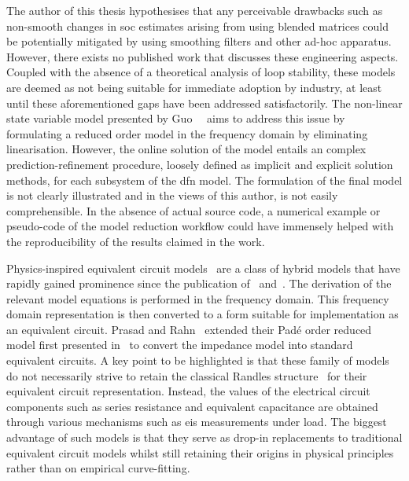 The author  of this thesis hypothesises  that any perceivable drawbacks  such as
non-smooth changes  in \gls{soc} estimates  arising from using  blended matrices
could  be potentially  mitigated by  using  smoothing filters  and other  ad-hoc
apparatus.  However,  there  exists  no  published  work  that  discusses  these
engineering aspects. Coupled with the absence  of a theoretical analysis of loop
stability,  these  models  are  deemed  as  not  being  suitable  for  immediate
adoption  by  industry, at  least  until  these  aforementioned gaps  have  been
addressed  satisfactorily.  The non-linear  state  variable  model presented  by
Guo~\etal{}~\cite{Guo2017} aims to  address this issue by  formulating a reduced
order model in  the frequency domain by eliminating  linearisation. However, the
online solution of the model entails an complex prediction-refinement procedure,
loosely defined as implicit and explicit solution methods, for each subsystem of
the  \gls{dfn}  model.  The  formulation  of the  final  model  is  not  clearly
illustrated and  in the views of  this author, is not  easily comprehensible. In
the absence  of actual source  code, a numerical  example or pseudo-code  of the
model reduction workflow could have immensely helped with the reproducibility of
the results claimed in the work.


Physics-inspired                        equivalent                       circuit
models~\cite{Prasad2014,Zhang2017,Cheng2017,Merla2018}  are  a class  of  hybrid
models   that   have   rapidly   gained   prominence   since   the   publication
of~\cite{Jokar2016}  and~\cite{Fan2015}. The  derivation of  the relevant  model
equations  is  performed   in  the  frequency  domain.   This  frequency  domain
representation is  then converted to  a form  suitable for implementation  as an
equivalent circuit. Prasad and Rahn~\cite{Prasad2014} extended their Padé order
reduced  model first  presented  in~\cite{Prasad2013} to  convert the  impedance
model into standard  equivalent circuits. A key point to  be highlighted is that
these family of models do not necessarily strive to retain the classical Randles
structure~\cite{Randles1947}  for   their  equivalent   circuit  representation.
Instead,  the  values  of  the  electrical circuit  components  such  as  series
resistance and  equivalent capacitance  are obtained through  various mechanisms
such as \gls{eis} measurements under load.  The biggest advantage of such models
is that  they serve  as drop-in replacements  to traditional  equivalent circuit
models whilst still  retaining their origins in physical  principles rather than
on empirical curve-fitting.


